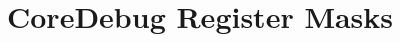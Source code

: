 \hypertarget{group___core_debug___register___masks}{}\section{Core\+Debug Register Masks}
\label{group___core_debug___register___masks}
